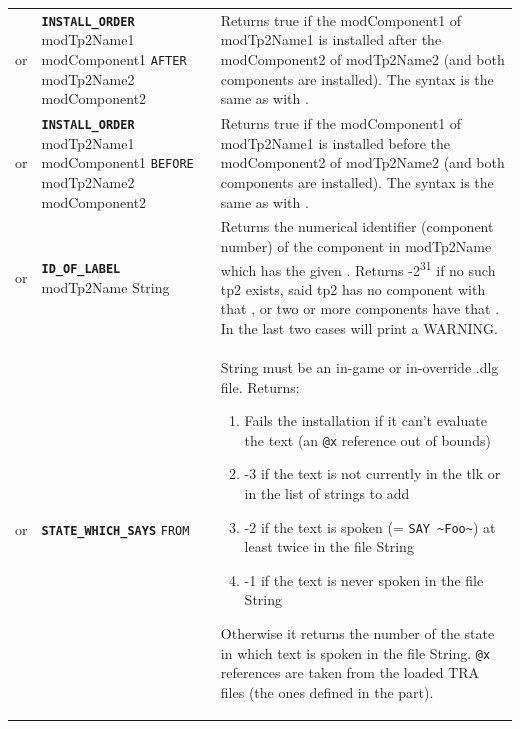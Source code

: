 \documentclass{article}
\def\ttref#1{\ahrefloc{#1}{\tt #1}}
\def\DEFINE#1{{\tt \bf #1}\label{#1}\index{#1}}
\def\DEFSYN#1{{\tt \bf #1}\index{#1}}
\def\t#1{{\tt #1}}
\begin{document}
\begin{tabular}{cp{10in}|p{10in}}
or & \DEFINE{INSTALL_ORDER} modTp2Name1 modComponent1 \t{AFTER} modTp2Name2 modComponent2 &
Returns true if the modComponent1 of modTp2Name1 is installed after the modComponent2
of modTp2Name2 (and both components are installed). The syntax
is the same as with \ttref {REQUIRE_COMPONENT}.  \\

or & \DEFSYN{INSTALL_ORDER} modTp2Name1 modComponent1 \t{BEFORE} modTp2Name2 modComponent2 &
Returns true if the modComponent1 of modTp2Name1 is installed before the modComponent2
of modTp2Name2 (and both components are installed). The syntax
is the same as with \ttref {REQUIRE_COMPONENT}.  \\

or & \DEFINE{ID_OF_LABEL} modTp2Name String &
  Returns the numerical identifier (component number) of the component
  in modTp2Name which has the given \ttref{LABEL}. Returns
  -2\textsuperscript{31} if no such tp2 exists, said tp2 has no
  component with that \ttref{LABEL}, or two or more components have
  that \ttref{LABEL}. In the last two cases will print a WARNING. \\

or & \DEFINE{STATE_WHICH_SAYS} \ttref{text} \t{FROM} \ttref{String} &
  String must be an in-game or in-override .dlg file. Returns:
  \begin{enumerate}
  \item Fails the installation if it can't evaluate the text (an \t{@x} reference out of bounds)
  \item -3 if the text is not currently in the tlk or in the list of strings to add
  \item -2 if the text is spoken (= \verb+SAY ~Foo~+) at least twice in the file String
  \item -1 if the text is never spoken in the file String
  \end{enumerate}
  Otherwise it returns the number of the state in which text is spoken in the file String.
  \t{@x} references are taken from the loaded TRA files (the ones defined in the
  \ttref{Language} part).
\\


\end{tabular}
\end{document}
